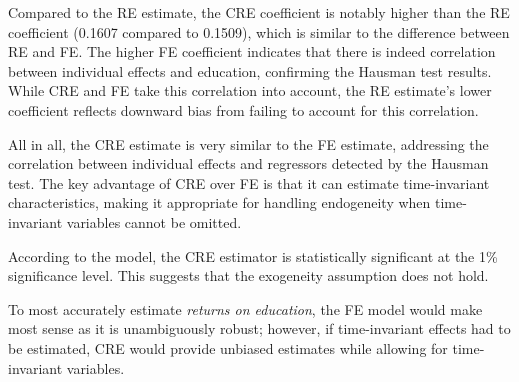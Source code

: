Compared to the RE estimate, the CRE coefficient is notably higher than the RE coefficient (0.1607 compared to 0.1509), which is similar to the difference between RE and FE. The higher FE coefficient indicates that there is indeed correlation between individual effects and education, confirming the Hausman test results. While CRE and FE take this correlation into account, the RE estimate's lower coefficient reflects downward bias from failing to account for this correlation.

All in all, the CRE estimate is very similar to the FE estimate, addressing the correlation between individual effects and regressors detected by the Hausman test. The key advantage of CRE over FE is that it can estimate time-invariant characteristics, making it appropriate for handling endogeneity when time-invariant variables cannot be omitted.


According to the model, the  CRE estimator is statistically significant at the 1\% significance level. This suggests that the exogeneity assumption does not hold.

To most accurately estimate \emph{returns on education}, the FE model would make most sense as it is unambiguously robust; however, if time-invariant effects had to be estimated, CRE would provide unbiased estimates while allowing for time-invariant variables.


